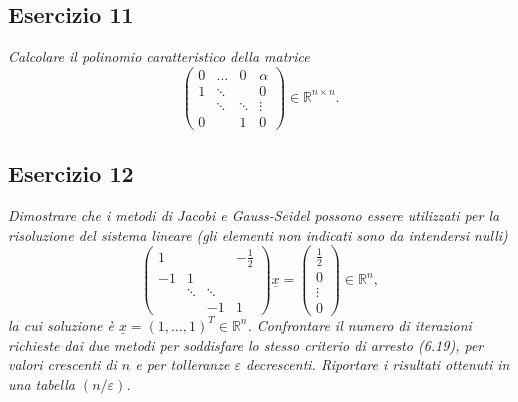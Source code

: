 \subsection{Esercizio 11}
\label{sub:es11}
\emph{Calcolare il polinomio caratteristico della matrice
			\[
				\begin{pmatrix}
					0 & \dots & 0 & \alpha\\
					1 & \ddots & & 0\\
					& \ddots & \ddots & \vdots\\
					0 & & 1 & 0
				\end{pmatrix}\in\mathbb{R}^{n\times n}.
			\]}

\subsection{Esercizio 12}
\label{sub:es12}
\emph{Dimostrare che i metodi di Jacobi e Gauss-Seidel possono essere utilizzati per la risoluzione del sistema lineare (gli elementi non indicati sono da intendersi nulli)
			\[
				\begin{pmatrix}
					1 & & & -\frac{1}{2}\\
					-1 & 1 & &\\
					& \ddots & \ddots &\\
					& & -1 & 1
				\end{pmatrix}\underline{x}=\begin{pmatrix}
					\frac{1}{2}\\
					0\\
					\vdots\\
					0
				\end{pmatrix}\in\mathbb{R}^n,
			\]
			la cui soluzione è $\underline{x}=(1,\dots,1)^T\in\mathbb{R}^n$.
      Confrontare il numero di iterazioni richieste dai due metodi per soddisfare lo stesso criterio di arresto (6.19),
      per valori crescenti di $n$ e per tolleranze $\varepsilon$ decrescenti. Riportare i risultati ottenuti in una tabella $(n/\varepsilon)$.
      }
